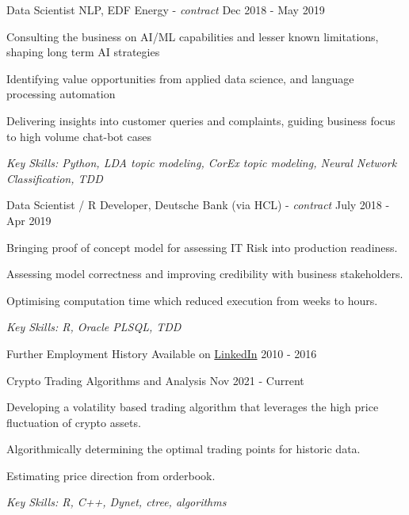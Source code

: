 \documentclass[11pt,article,oneside]{memoir}
\newenvironment{itemize*}{%
  \renewcommand\labelitemi{\textbullet}
  \footnotesize
  \begin{itemize}%
    \setlength{\itemsep}{0pt}}%
  {\end{itemize}
}
\begin{document}
\newpage

\normalsize
\medskip
\ind Data Scientist NLP, EDF Energy - \emph{contract} \hfill Dec 2018 - May 2019
\begin{itemize*}
    \item Consulting the business on AI/ML capabilities and lesser known limitations, shaping long term AI strategies
    \item Identifying value opportunities from applied data science, and language processing automation
    \item Delivering insights into customer queries and complaints, guiding business focus to high volume chat-bot cases
\end{itemize*}
\ind \hspace{0.35in} \footnotesize \emph{Key Skills: Python, LDA topic modeling, CorEx topic modeling, Neural Network Classification, TDD }



\normalsize
\medskip
\ind Data Scientist / R Developer, Deutsche Bank (via HCL) - \emph{contract} \hfill July 2018 - Apr 2019
\begin{itemize*}
    \item Bringing proof of concept model for assessing IT Risk into production readiness.
    \item Assessing model correctness and improving credibility with business stakeholders. 
    \item Optimising computation time which reduced execution from weeks to hours.
\end{itemize*}
\ind \hspace{0.35in} \footnotesize \emph{Key Skills: R, Oracle PLSQL, TDD}

\normalsize
\medskip
\ind Further Employment History Available on \href{https://uk.linkedin.com/in/adrian-ionita-6a923129}{LinkedIn} \hfill 2010 - 2016


\normalsize
\medskip
\ind Crypto Trading Algorithms and Analysis \hfill Nov 2021 - Current
\begin{itemize*}
  \item Developing a volatility based trading algorithm that leverages the high price fluctuation of crypto assets.
  \item Algorithmically determining the optimal trading points for historic data. 
  \item Estimating price direction from orderbook.
\end{itemize*}
\ind \hspace{0.35in} \footnotesize \emph{Key Skills: R, C++, Dynet, ctree, algorithms }
\end{document}
